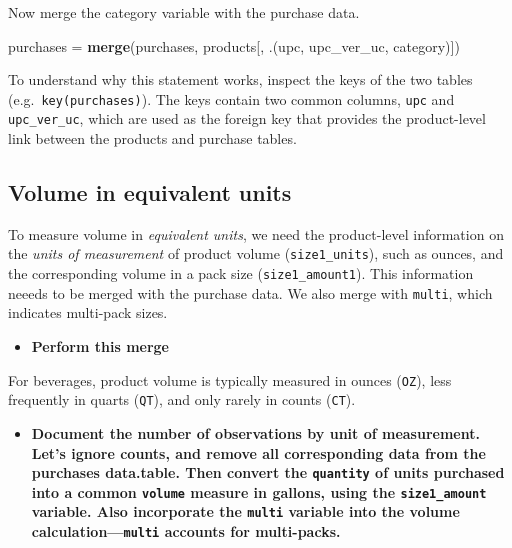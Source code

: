 \documentclass[
]{article}
\newenvironment{Shaded}{\begin{snugshade}}{\end{snugshade}}
\newcommand{\FunctionTok}[1]{\textcolor[rgb]{0.13,0.29,0.53}{\textbf{#1}}}
\newcommand{\NormalTok}[1]{#1}
\newcommand{\OtherTok}[1]{\textcolor[rgb]{0.56,0.35,0.01}{#1}}
\providecommand{\tightlist}{%
  \setlength{\itemsep}{0pt}\setlength{\parskip}{0pt}}
\begin{document}
Now merge the category variable with the purchase data.

\begin{Shaded}
\begin{Highlighting}[]
\NormalTok{purchases }\OtherTok{=} \FunctionTok{merge}\NormalTok{(purchases, products[, .(upc, upc\_ver\_uc, category)])}
\end{Highlighting}
\end{Shaded}

To understand why this statement works, inspect the keys of the two
tables (e.g.~\texttt{key(purchases)}). The keys contain two common
columns, \texttt{upc} and \texttt{upc\_ver\_uc}, which are used as the
foreign key that provides the product-level link between the products
and purchase tables.

\subsection{Volume in equivalent
units}\label{volume-in-equivalent-units}

To measure volume in \emph{equivalent units}, we need the product-level
information on the \emph{units of measurement} of product volume
(\texttt{size1\_units}), such as ounces, and the corresponding volume in
a pack size (\texttt{size1\_amount1}). This information neeeds to be
merged with the purchase data. We also merge with \texttt{multi}, which
indicates multi-pack sizes.

\begin{itemize}
\tightlist
\item
  \textbf{Perform this merge}
\end{itemize}

For beverages, product volume is typically measured in ounces
(\texttt{OZ}), less frequently in quarts (\texttt{QT}), and only rarely
in counts (\texttt{CT}).

\begin{itemize}
\tightlist
\item
  \textbf{Document the number of observations by unit of measurement.
  Let's ignore counts, and remove all corresponding data from the
  purchases data.table. Then convert the \texttt{quantity} of units
  purchased into a common \texttt{volume} measure in gallons, using the
  \texttt{size1\_amount} variable. Also incorporate the \texttt{multi}
  variable into the volume calculation---\texttt{multi} accounts for
  multi-packs.}
\end{itemize}
\end{document}
